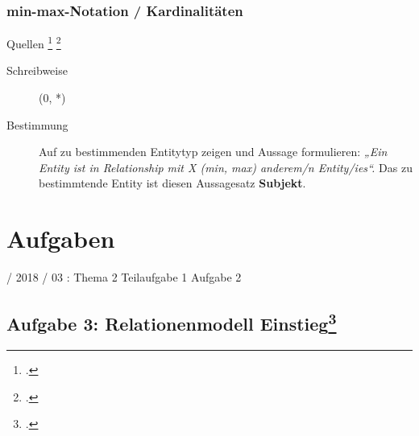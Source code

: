 \documentclass{lehramt-informatik-haupt}
\begin{document}
\subsection{min-max-Notation / Kardinalitäten}

Quellen
\footcite[2.7.3 Seite 46]{kemper}
\footcite[Seite 62]{brinda}

\begin{description}
\item[Schreibweise] (0, *)
\item[Bestimmung]

Auf zu bestimmenden Entitytyp zeigen und Aussage formulieren:
%
\emph{„Ein Entity ist in Relationship mit X (min, max) anderem/n
Entity/ies“.}
%
Das zu bestimmtende Entity ist diesen Aussagesatz \textbf{Subjekt}.
\end{description}


\chapter{Aufgaben}

%

 / 2018 / 03 : Thema 2 Teilaufgabe 1 Aufgabe 2



\section{Aufgabe 3: Relationenmodell Einstieg\footcite[Seite 2-3]{db:pu:1}}
\end{document}
